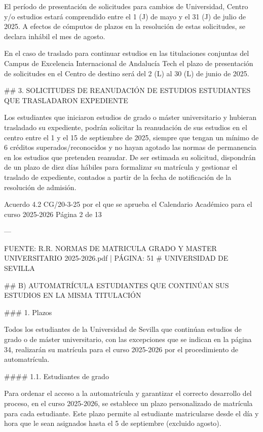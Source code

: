 \documentclass{article}
\begin{document}
\begin{itemize}
\begin{itemize}
\begin{scriptsize}
                  El período de presentación de solicitudes para cambios de Universidad, Centro y/o estudios estará comprendido entre el 1 (J) de mayo y el 31 (J) de julio de 2025. A efectos de cómputos de plazos en la resolución de estas solicitudes, se declara inhábil el mes de agosto.

                  En el caso de traslado para continuar estudios en las titulaciones conjuntas del Campus de Excelencia Internacional de Andalucía Tech el plazo de presentación de solicitudes en el Centro de destino será del 2 (L) al 30 (L) de junio de 2025.

                  \#\# 3. SOLICITUDES DE REANUDACIÓN DE ESTUDIOS ESTUDIANTES QUE TRASLADARON EXPEDIENTE

                  Los estudiantes que iniciaron estudios de grado o máster universitario y hubieran trasladado su expediente, podrán solicitar la reanudación de sus estudios en el centro entre el 1 y el 15 de septiembre de 2025, siempre que tengan un mínimo de 6 créditos superados/reconocidos y no hayan agotado las normas de permanencia en los estudios que pretenden reanudar. De ser estimada su solicitud, dispondrán de un plazo de diez días hábiles para formalizar su matrícula y gestionar el traslado de expediente, contados a partir de la fecha de notificación de la resolución de admisión.

                  Acuerdo 4.2 CG/20-3-25 por el que se aprueba el Calendario Académico para el curso 2025-2026  Página 2 de 13

                  ---

                  FUENTE: R.R. NORMAS DE MATRICULA GRADO Y MASTER UNIVERSITARIO 2025-2026.pdf | PÁGINA: 51
                  \# UNIVERSIDAD DE SEVILLA

                  \#\# B) AUTOMATRÍCULA ESTUDIANTES QUE CONTINÚAN SUS ESTUDIOS EN LA MISMA TITULACIÓN

                  \#\#\# 1. Plazos

                  Todos los estudiantes de la Universidad de Sevilla que continúan estudios de grado o de máster universitario, con las excepciones que se indican en la página 34, realizarán su matrícula para el curso 2025-2026 por el procedimiento de automatrícula.

                  \#\#\#\# 1.1. Estudiantes de grado

                  Para ordenar el acceso a la automatrícula y garantizar el correcto desarrollo del proceso, en el curso 2025-2026, se establece un plazo personalizado de matrícula para cada estudiante. Este plazo permite al estudiante matricularse desde el día y hora que le sean asignados hasta el 5 de septiembre (excluido agosto).


\end{scriptsize}
\end{itemize}
\end{itemize}
\end{document}
